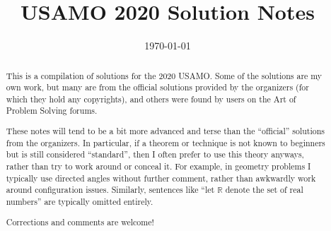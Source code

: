 \documentclass[11pt]{scrartcl}
\title{USAMO 2020 Solution Notes}
\date{\today}
\begin{document}
\maketitle

\begin{abstract}
This is a compilation of solutions
for the 2020 USAMO.
Some of the solutions are my own work,
but many are from the official solutions provided by the organizers
(for which they hold any copyrights),
and others were found by users on the Art of Problem Solving forums.

These notes will tend to be a bit more advanced and terse than the ``official''
solutions from the organizers.
In particular, if a theorem or technique is not known to beginners
but is still considered ``standard'', then I often prefer to
use this theory anyways, rather than try to work around or conceal it.
For example, in geometry problems I typically use directed angles
without further comment, rather than awkwardly work around configuration issues.
Similarly, sentences like ``let $\mathbb{R}$ denote the set of real numbers''
are typically omitted entirely.

Corrections and comments are welcome!
\end{abstract}

\tableofcontents
\newpage

\addtocounter{section}{-1}
\end{document}
